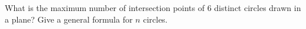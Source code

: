 What is the maximum number of intersection points of \(6\) distinct circles drawn in a plane? Give a general formula for \(n\) circles.
